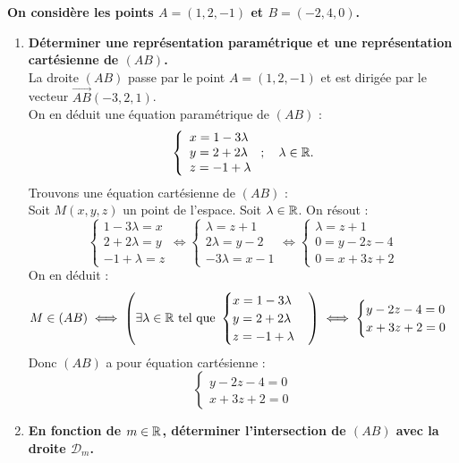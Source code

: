 \documentclass[a4paper, 11pt,reqno]{article}
\begin{document}
\begin{correction}   \;
\textbf{On consid\`ere les points $A=(1,2,-1)$ et $B=(-2,4,0)$.}
\begin{enumerate}
\item \textbf{D\'eterminer une repr\'esentation param\'etrique et une repr\'esentation cart\'esienne de $(AB)$.}\\
La droite $(AB)$ passe par le point $A=(1,2,-1)$ et est dirig\'ee par le vecteur $\overrightarrow{AB}(-3,2,1)$. \\
On en d\'eduit une \'equation param\'etrique de $(AB)$ :
$$ \left\{ \begin{array}{l}
	x = 1-3\lambda \\
	y= 2+2\lambda \\
	z = -1+\lambda
\end{array}\right. ; \quad \lambda\in \mathbb{R} .$$
Trouvons une \'equation cart\'esienne de $(AB)$ :\\
Soit $M(x,y,z)$ un point de l'espace. Soit $\lambda \in \mathbb{R}$. On r\'esout :
$$ \begin{cases} 1-3\lambda = x \\ 2+2\lambda = y \\ -1+\lambda = z\end{cases} 
\Leftrightarrow
\begin{cases} \lambda = z+1 \\ 2\lambda = y-2 \\ -3\lambda = x-1 \end{cases}
\Leftrightarrow
 \begin{cases} \lambda = z+1 \\ 0 = y-2z-4\\ 0 = x+3z+2\end{cases} $$
On en d\'eduit :
$$  M \in (AB)\iff \left(\exists \lambda \in \mathbb{R} \text{ tel que } \begin{cases} x = 1-3\lambda \\
	y= 2+2\lambda \\
	z = -1+\lambda\end{cases}\right) \iff \begin{cases} y-2z-4 = 0 \\ x+3z+2 = 0\end{cases} $$
Donc $(AB)$ a pour \'equation cart\'esienne :
$$ \begin{cases} y-2z-4 = 0 \\ x+3z+2 = 0\end{cases} $$
\item \textbf{En fonction de $m \in \mathbb{R}$, d\'eterminer l'intersection de $(AB)$ avec la droite $\mathcal{D}_m$.}\\

\end{enumerate}
\end{correction}
\end{document}
